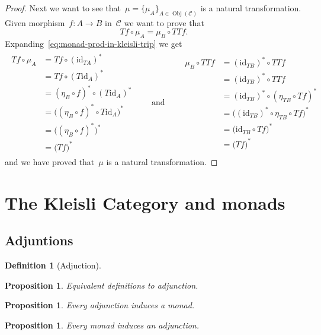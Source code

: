 \documentclass[a4paper]{article}
\theoremstyle{plain}
\newtheorem{proposition}[theorem]{Proposition}
\theoremstyle{definition}
\newtheorem{definition}[theorem]{Definition}
\DeclareMathOperator{\Obj}{Obj}
\newcommand{\id}{\mathrm{id}}
\newcommand{\cat}[1]{\mathcal{#1}}
\begin{document}
\begin{proof}
    Next we want to see that~\(\mu=\{\mu_{A}\}_{A\in\Obj(\cat{C})}\) is a
    natural transformation.
    Given morphism~\(f:A\longrightarrow B\) in~\(\cat{C}\) we want to prove that
    \[
        Tf \circ \mu_{A} = \mu_{B} \circ TTf.
    \]
    Expanding~\eqref{eq:monad-prod-in-kleisli-trip} we get
    \begin{gather*}
        \begin{split}
            Tf \circ \mu_{A} &= Tf \circ (\id_{TA})^{\ast} \\
                &= Tf \circ (T\id_{A})^{\ast} \\
                &= (\eta_{B} \circ f)^{\ast} \circ (T\id_{A})^{\ast} \\
                &= \bigl((\eta_{B} \circ f)^{\ast} \circ T\id_{A}\bigr)^{\ast} \\
                &= \bigl((\eta_{B} \circ f)^{\ast}\bigr)^{\ast} \\
                &= \bigl(Tf\bigr)^{\ast}
        \end{split}
        \qquad\text{and}\qquad
        \begin{split}
            \mu_{B} \circ TTf &= (\id_{TB})^{\ast} \circ TTf \\
                &= (\id_{TB})^{\ast} \circ TTf \\
                &= (\id_{TB})^{\ast} \circ (\eta_{TB} \circ Tf)^{\ast} \\
                &= \bigl((\id_{TB})^{\ast} \circ \eta_{TB} \circ Tf\bigr)^{\ast} \\
                &= \bigl(\id_{TB} \circ Tf\bigr)^{\ast} \\
                &= \bigl(Tf\bigr)^{\ast}
    \end{split}
    \end{gather*}
    and we have proved that~\(\mu\) is a natural transformation.
\end{proof}

\section{The Kleisli Category and monads}
\subsection{Adjuntions}
\begin{definition}[Adjuction]
\end{definition}
\begin{proposition}
    Equivalent definitions to adjunction.
\end{proposition}
\begin{proposition}
    Every adjunction induces a monad.
\end{proposition}
\begin{proposition}
    Every monad induces an adjunction.
\end{proposition}
\end{document}

